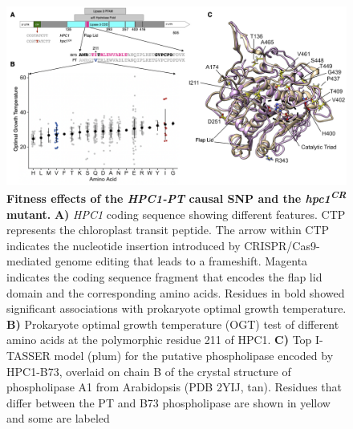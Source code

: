 \documentclass[9pt,twocolumn,twoside,lineno]{biorxiv}
\begin{document}
\begin{figure}[!ht]
\begin{center}
\includegraphics[width=0.8\paperwidth]{Figures/Fig_5.png}
\caption{\textbf{Fitness effects of the \textit{HPC1-PT} causal SNP and the \textit{hpc1\textsuperscript{CR}} mutant.} 
\textbf{A)} \textit{HPC1} coding sequence showing different features. 
CTP represents the chloroplast transit peptide. 
The arrow within CTP indicates the nucleotide insertion introduced by CRISPR/Cas9-mediated genome editing that leads to a frameshift.
Magenta indicates the coding sequence fragment that encodes the flap lid domain and the corresponding amino acids.
Residues in bold showed significant associations with prokaryote optimal growth temperature.
\textbf{B)} Prokaryote optimal growth temperature (OGT) test of different amino acids at the polymorphic residue 211 of HPC1.
\textbf{C)} Top I-TASSER model (plum) for the putative phospholipase encoded by HPC1-B73, overlaid on chain B of the crystal structure of phospholipase A1 from
Arabidopsis (PDB 2YIJ, tan). 
Residues that differ between the PT and B73 phospholipase are shown in yellow and some are labeled} 
\label{Fig5}
\end{center}
\end{figure}
\end{document}
